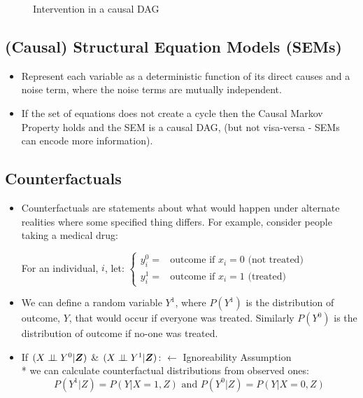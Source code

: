 \documentclass[b0,landscape,25pt]{sciposter}
\begin{document}
\begin{multicols}{5}
\begin{figure}
\caption{Intervention in a causal DAG}
\label{fig:intervention}
\centering
{}
\end{figure}

\subsection*{(Causal) Structural Equation Models (SEMs)}
\begin{itemize}
\item Represent each variable as a deterministic function of its direct causes and a noise term, where the noise terms are mutually independent.

\item If the set of equations does not create a cycle then the Causal Markov Property holds and the SEM is a causal DAG, (but not visa-versa - SEMs can encode more information).
\end{itemize}


\subsection*{Counterfactuals}
\begin{itemize}
\item Counterfactuals are statements about what would happen under alternate realities where some specified thing differs. For example, consider people taking a medical drug:

For an individual, $i$, let: $\begin{cases}y^{0}_{i} =& \text{outcome if $x_{i}=0$ (not treated)} \\ y^{1}_{i} =& \text{outcome if $x_{i}=1$ (treated)}
\end{cases}$ 

\item We can define a random variable $Y^{1}$, where $P(Y^{1})$ is the distribution of outcome, $Y$, that would occur if everyone was treated. Similarly $P(Y^{0})$ is the distribution of outcome if no-one was treated. 
\item If   $(X \perp\!\!\!\perp Y^{0}|\boldsymbol{Z})$ \&  $(X\perp\!\!\!\perp Y^{1}|\boldsymbol{Z})$:  $\longleftarrow$ Ignoreability Assumption \\*
we can calculate counterfactual distributions from observed ones:
\begin{equation*}
P(Y^{1}|Z) = P(Y|X=1,Z) \text{ and } P(Y^{0}|Z) = P(Y|X=0,Z)
\end{equation*}


\end{itemize}
\end{multicols}
\end{document}

